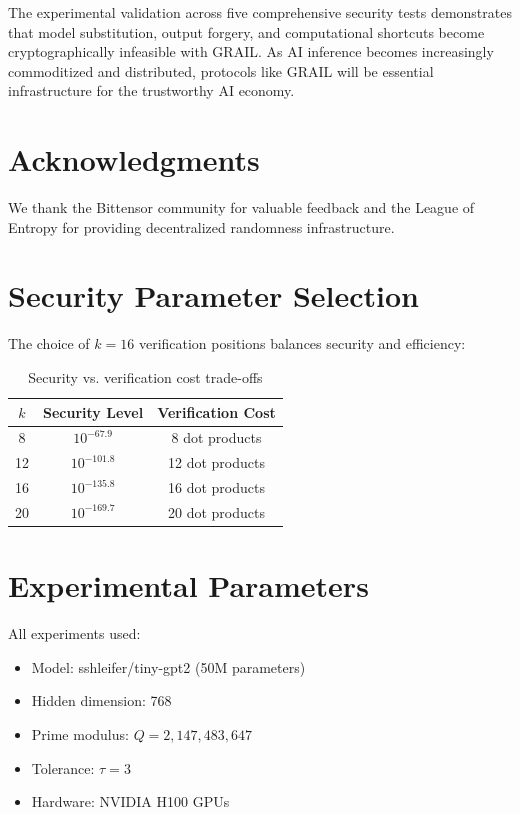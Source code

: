 \documentclass[11pt,a4paper]{article}
\begin{document}
The experimental validation across five comprehensive security tests demonstrates that model substitution, output forgery, and computational shortcuts become cryptographically infeasible with GRAIL. As AI inference becomes increasingly commoditized and distributed, protocols like GRAIL will be essential infrastructure for the trustworthy AI economy.

\section*{Acknowledgments}

We thank the Bittensor community for valuable feedback and the League of Entropy for providing decentralized randomness infrastructure.




\appendix

\section{Security Parameter Selection}

The choice of $k=16$ verification positions balances security and efficiency:

\begin{table}[h]
\centering
\begin{tabular}{|c|c|c|}
\hline
$k$ & Security Level & Verification Cost \\
\hline
8 & $10^{-67.9}$ & 8 dot products \\
12 & $10^{-101.8}$ & 12 dot products \\
16 & $10^{-135.8}$ & 16 dot products \\
20 & $10^{-169.7}$ & 20 dot products \\
\hline
\end{tabular}
\caption{Security vs. verification cost trade-offs}
\end{table}

\section{Experimental Parameters}

All experiments used:
\begin{itemize}
    \item Model: sshleifer/tiny-gpt2 (50M parameters)
    \item Hidden dimension: 768
    \item Prime modulus: $Q = 2,147,483,647$
    \item Tolerance: $\tau = 3$
    \item Hardware: NVIDIA H100 GPUs
\end{itemize}
\end{document}
